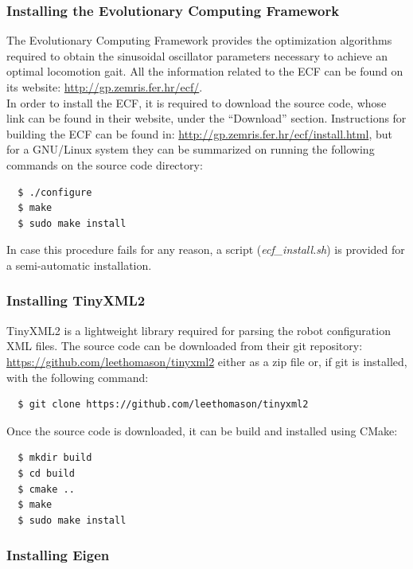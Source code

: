 \subsubsection{Installing the Evolutionary Computing Framework}
\label{software_install_ecf}

The Evolutionary Computing Framework provides the optimization algorithms required to obtain the sinusoidal oscillator parameters necessary to achieve an optimal locomotion gait. All the information related to the ECF can be found on its website: \url{http://gp.zemris.fer.hr/ecf/}.\\

In order to install the ECF, it is required to download the source code, whose link can be found in their website, under the ``Download'' section. Instructions for building the ECF can be found in: \url{http://gp.zemris.fer.hr/ecf/install.html}, but for a GNU/Linux system they can be summarized on running the following commands on the source code directory:
\Bash
\begin{lstlisting}
  $ ./configure
  $ make
  $ sudo make install
\end{lstlisting}

In case this procedure fails for any reason, a script (\emph{ecf\_install.sh}) is provided for a semi-automatic installation.

\subsubsection{Installing TinyXML2}
\label{software_install_TinyXML2}

TinyXML2 is a lightweight library required for parsing the robot configuration XML files. The source code can be downloaded from their git repository: \url{https://github.com/leethomason/tinyxml2} either as a zip file or, if git is installed, with the following command:
\Bash
\begin{lstlisting}
  $ git clone https://github.com/leethomason/tinyxml2
\end{lstlisting}

Once the source code is downloaded, it can be build and installed using CMake:
\Bash
\begin{lstlisting}
  $ mkdir build
  $ cd build
  $ cmake ..
  $ make
  $ sudo make install
\end{lstlisting}

\subsubsection{Installing Eigen}
\label{software_install_eigen}

